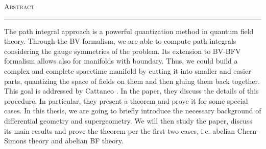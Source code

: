 \thispagestyle{plain}
\vspace*{3cm}
\begin{center}
    \textsc{\LARGE Abstract}

    \rule{5cm}{0.4pt}

    \vspace{1cm}
\end{center}
The path integral approach is a powerful quantization method in quantum field theory.
Through the BV formalism, we are able to compute path integrals considering the gauge symmetries of the problem.
Its extension to BV-BFV formalism allows also for manifolds with boundary.
Thus, we could build a complex and complete spacetime manifold by cutting it into smaller and easier parts, quantizing the space of fields on them and then gluing them back together.
This goal is addressed by Cattaneo \etal \cite{Gluing_BV-BFV}.
In the paper, they discuss the details of this procedure.
In particular, they present a theorem and prove it for some special cases.
In this thesis, we are going to briefly introduce the necessary background of differential geometry and supergeometry.
We will then study the paper, discuss its main results and prove the theorem per the first two cases, i.e. abelian Chern-Simons theory and abelian BF theory.

\restoregeometry
\newpage